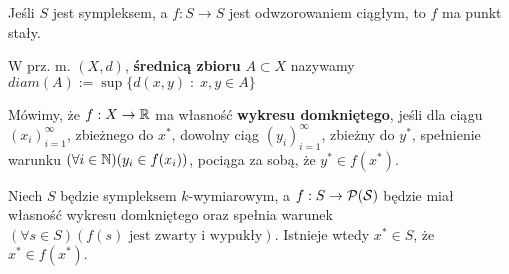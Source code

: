 \begin{twierdzenie}
    Jeśli $S$ jest sympleksem, a $f: S \rightarrow S$ jest odwzorowaniem ciągłym, to $f$ ma punkt stały.
\end{twierdzenie}

\begin{definicja}
    W prz. m. $(X, d)$, \textbf{średnicą zbioru} $A \subset X$ nazywamy $diam(A) := \sup{\{d(x,y)\;:\; x, y \in A\}}$
\end{definicja}

\begin{definicja}
    Mówimy, że $f: X \rightarrow \mathbb{R}$ ma własność \textbf{wykresu domkniętego}, jeśli dla ciągu ${(x_i)_{i=1}^{\infty}}$, 
    zbieżnego do $x^*$, dowolny ciąg ${(y_i)_{i=1}^{\infty}}$, zbieżny do $y^*$, spełnienie warunku $(\forall i \in \mathbb{N})(y_i \in f(x_i))$,
    pociąga za sobą, że $y^* \in f(x^*)$.
\end{definicja}

\begin{twierdzenie}
    Niech $S$ będzie sympleksem $k$-wymiarowym, a $f: S \rightarrow \cal{P}(S)$ będzie miał własność wykresu domkniętego
    oraz spełnia warunek $(\forall s \in S)(f(s) \text{ jest zwarty i wypukły})$.
    Istnieje wtedy $x^* \in S$, że $x^* \in f(x^*)$.
\end{twierdzenie}